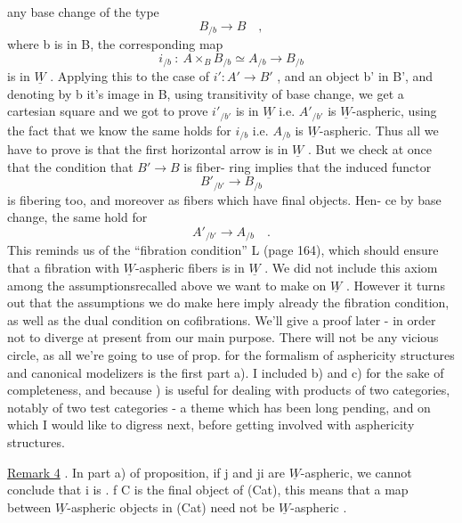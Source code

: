 
any base change of the type
\[ B_{/b} \longrightarrow B \quad , \]
where b is in B,  the corresponding map
\[ i_{/b} \ : \ A\times_{B}B_{/b} \simeq A_{/b} \longrightarrow B_{/b} \]
is in $\underline{W}$ .  Applying this to the case of $i' : A' \longrightarrow B'$ ,  and an  object
b' in B',  and denoting by b it's image in B,   using transitivity of
base change,  we get a cartesian square
and we got to prove $i'_{/b'}$ is in $\underline{W}$  i.e. $A'_{/b'}$ is $\underline{W}$-aspheric,  using
the fact that we know the same holds for $i_{/b}$  i.e. $A_{/b}$ is $\underline{W}$-aspheric.
Thus all we have to prove is that the first horizontal arrow
is in $\underline{W}$ .  But we check at once that the condition that $B' \longrightarrow B$ is fiber-%
ring  implies that the induced functor  
\[ B'_{/b'} \longrightarrow B_{/b} \]
is fibering too,  and moreover as fibers which have final objects.  Hen-%
ce by base change,  the same  hold for  
\[ A'_{/b'} \rightarrow A_{/b} \quad . \]
This reminds us of the ``fibration condition''  L   (page 164),  which
should ensure that a fibration with $\underline{W}$-aspheric fibers is in $\underline{W}$ .  We did
not include this axiom among the assumptions\hand{(}recalled above\hand{)}  we want to
make on $\underline{W}$ .  However it turns out that the assumptions we do make here
imply already the fibration condition,  as well as the dual condition
on cofibrations.  We'll give a proof later  -  in order not to diverge
at present from our main purpose.  There will not be any vicious circle,
as all we're going to use of prop.  for the formalism of asphericity
structures  and canonical modelizers is the first part a).  I included
b) and c) for the sake of completeness,  and because ) is useful for
dealing with products of two categories,  notably of two test categories
-  a theme which has been long pending,  and on which I would like to
digress next,  before getting involved with asphericity structures.

\uline{Remark 4} .  In part a) of proposition,  if j and ji are $\underline{W}$-aspheric,  we
cannot conclude that i is .  f C is the final object of (Cat),  this
means that a map between $\underline{W}$-aspheric objects in (Cat) need not be
$\underline{W}$-aspheric .

